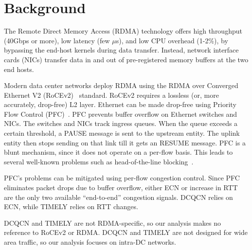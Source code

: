 \vspace{-0.1em}
\section{Background}
The Remote Direct Memory Access (RDMA) technology offers high throughput (40Gbps
or more), low latency (few $\mu$s), and low CPU overhead (1-2\%), by bypassing
the end-host kernels during data transfer. Instead, network interface cards
(NICs) transfer data in and out of pre-registered memory buffers at the two end
hosts.

Modern data center networks deploy RDMA using the RDMA over Converged Ethernet
V2 (RoCEv2)~\cite{rocev2} standard.  RoCEv2 requires a lossless (or, more
accurately, drop-free) L2 layer. Ethernet can be made drop-free using Priority
Flow Control (PFC)~\cite{pfc}. PFC prevents buffer overflow on Ethernet switches
and NICs. The switches and NICs track ingress queues. When the queue exceeds a
certain threshold, a PAUSE message is sent to the upstream entity. The uplink
entity then stops sending on that link till it gets an RESUME message.  PFC is a
blunt mechanism, since it does not operate on a per-flow basis. This leads to
several well-known problems such as head-of-the-line
blocking~\cite{dcqcn,tcp-bolt}. 

PFC's problems can be mitigated using per-flow congestion control. Since PFC
eliminates packet drops due to buffer overflow, either ECN or increase in RTT
are the only two available ``end-to-end'' congestion signals.  DCQCN relies on
ECN, while TIMELY relies on RTT changes.

DCQCN and TIMELY are not RDMA-specific, so our analysis makes no reference to RoCEv2
or RDMA. DCQCN and TIMELY are not designed for wide area traffic, so our
analysis focuses on intra-DC networks. 
